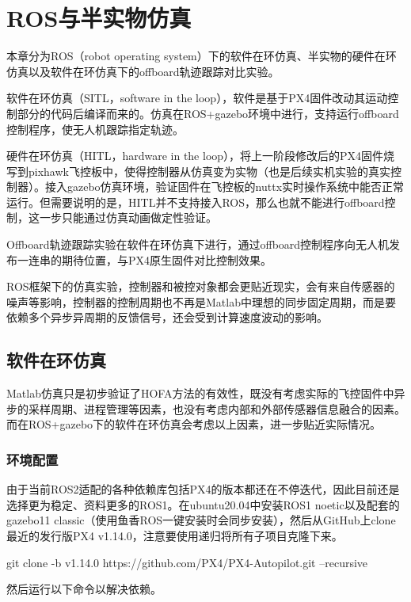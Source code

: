 \chapter{ROS与半实物仿真}
本章分为ROS（robot operating system）下的软件在环仿真、半实物的硬件在环仿真以及软件在环仿真下的offboard轨迹跟踪对比实验。

软件在环仿真（SITL，software in the loop），软件是基于PX4固件改动其运动控制部分的代码后编译而来的。仿真在ROS+gazebo环境中进行，支持运行offboard控制程序，使无人机跟踪指定轨迹。

硬件在环仿真（HITL，hardware in the loop），将上一阶段修改后的PX4固件烧写到pixhawk飞控板中，使得控制器从仿真变为实物（也是后续实机实验的真实控制器）。接入gazebo仿真环境，验证固件在飞控板的nuttx实时操作系统中能否正常运行。但需要说明的是，HITL并不支持接入ROS，那么也就不能进行offboard控制，这一步只能通过仿真动画做定性验证。

Offboard轨迹跟踪实验在软件在环仿真下进行，通过offboard控制程序向无人机发布一连串的期待位置，与PX4原生固件对比控制效果。

ROS框架下的仿真实验，控制器和被控对象都会更贴近现实，会有来自传感器的噪声等影响，控制器的控制周期也不再是Matlab中理想的同步固定周期，而是要依赖多个异步异周期的反馈信号，还会受到计算速度波动的影响。

\section{软件在环仿真}
Matlab仿真只是初步验证了HOFA方法的有效性，既没有考虑实际的飞控固件中异步的采样周期、进程管理等因素，也没有考虑内部和外部传感器信息融合的因素。而在ROS+gazebo下的软件在环仿真会考虑以上因素，进一步贴近实际情况。

\subsection{环境配置}
由于当前ROS2适配的各种依赖库包括PX4的版本都还在不停迭代，因此目前还是选择更为稳定、资料更多的ROS1。在ubuntu20.04中安装ROS1 noetic以及配套的gazebo11 classic（使用鱼香ROS一键安装\cite{fishros}时会同步安装），然后从GitHub上clone最近的发行版PX4 v1.14.0，注意要使用递归将所有子项目克隆下来。
\begin{codeblock}[language=C]
  git clone -b v1.14.0 https://github.com/PX4/PX4-Autopilot.git --recursive
\end{codeblock}



然后运行以下命令以解决依赖。

